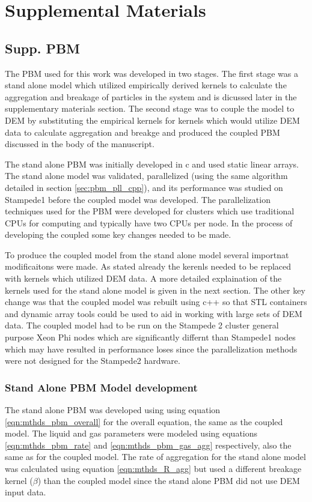 
\section{Supplemental Materials}

\subsection{Supp. PBM}
\label{sec:supp_pbm_model}

	The PBM used for this work was developed in two stages. The first stage was a stand alone model 
which utilized empirically derived kernels to calculate the aggregation and breakage of particles in the system and is dicussed later in the supplementary materials section. The second stage was to couple the model to DEM by 
substituting the empirical kernels for kernels which would utilize DEM data to calculate aggregation and breakge and produced the coupled PBM discussed in the body of the manuscript. 
	
	The stand alone PBM was initially developed in c  and used static linear arrays. The stand alone model was validated, parallelized (using the same algorithm detailed in section \ref{sec:pbm_pll_cpp}), and its performance was studied on Stampede1 before the coupled model was developed. The parallelization techniques used for the PBM were developed for clusters which use traditional CPUs for computing and typically have two CPUs per node. In the process of developing the coupled some key changes needed to be made. 
	
	To produce the coupled model from the stand alone model several importnat modificaitons were made. As stated already the kerenls needed to be replaced with kernels which utilized DEM data. A more detailed explaination of the kernels used for the stand alone model is given in the next section. The other key change was that the coupled model was rebuilt using c++ so that STL containers and dynamic array tools could be used to aid in working with large sets of DEM data. The coupled model had to be run on the Stampede 2 cluster general purpose Xeon Phi nodes which are significantly differnt than Stampede1 nodes which may have resulted in performance loses since the parallelization methods were not designed for the Stampede2 hardware. 


\subsubsection{Stand Alone PBM Model development}
\label{sec:supp_sa_pbm_dev}
The stand alone PBM was developed using using equation \ref{eqn:mthds_pbm_overall} for the overall 
equation, the same as the coupled model. The liquid and gas parameters were modeled using equations \ref{eqn:mthds_pbm_rate} and \ref{eqn:mthds_pbm_gas_agg} respectively, also the same as for the coupled model. The rate of aggregation for
the stand alone model was calculated using equation \ref{eqn:mthds_R_agg} but used a different breakage kernel ($\beta$) than the coupled model since the stand alone PBM did not use DEM input data.  



